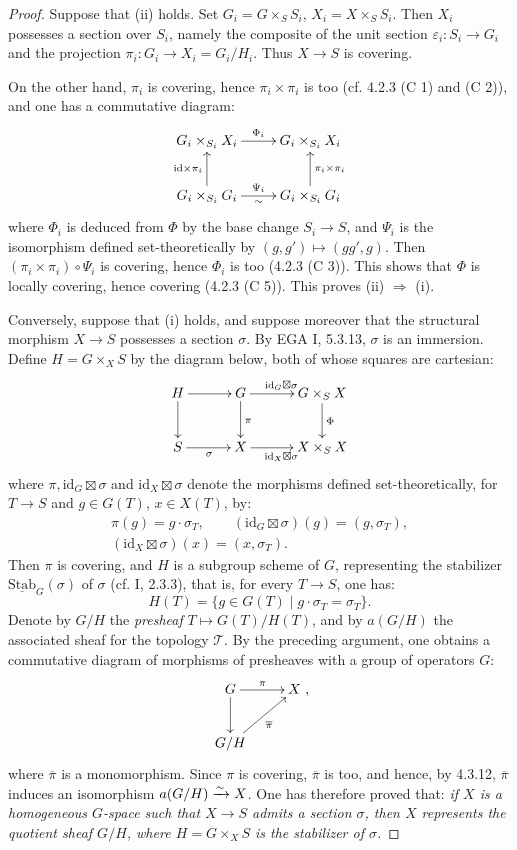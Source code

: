 \begin{proof}
Suppose that (ii) holds.
Set \(G_i=G\times_S S_i\),
\(X_i=X\times_S S_i\).
Then \(X_i\) possesses a section
over \(S_i\), namely the
composite of the unit section
\(\varepsilon_i:S_i\to G_i\)
and the projection
\(\pi_i:G_i\to X_i=G_i/H_i\).
Thus \(X\to S\) is covering.

On the other hand, \(\pi_i\)
is covering, hence \(\pi_i\times\pi_i\)
is too (cf. 4.2.3 (C 1)
and (C 2)), and one has
a commutative diagram:
\[
\xymatrix{
G_i\times_{S_i}X_i\ar[r]^{\Phi_i}
 & G_i\times_{S_i}X_i\\
G_i\times_{S_i}G_i
\ar[u]^{\mathrm{id}\times\pi_i}
\ar[r]_{\sim}^{\Psi_i}
 & G_i\times_{S_i}G_i
\ar[u]_{\pi_i\times\pi_i} }
\]
where \(\Phi_i\) is deduced
from \(\Phi\) by the base
change \(S_i\to S\), and
\(\Psi_i\) is the isomorphism
defined set-theoretically by
\((g,g')\mapsto(gg',g)\).
Then \((\pi_i\times\pi_i)\circ\Psi_i\)
is covering, hence \(\Phi_i\)
is too (4.2.3 (C 3)).
This shows that \(\Phi\) is
\og locally covering\fg, hence
covering (4.2.3 (C 5)).
This proves (ii) \(\Rightarrow\) (i).

Conversely, suppose that (i)
holds, and suppose moreover
that the structural morphism
\(X\to S\) possesses a section
\(\sigma\). By EGA I, 5.3.13,
\(\sigma\) is an immersion.
Define \(H=G\times_X S\)
by the diagram below, both
of whose squares are cartesian:
\[
\xymatrix@C=3em{
H\ar[r]\ar[d] & G\ar[r]^{\mathrm{id}_G\boxtimes\sigma}\ar[d]^\pi
 & G\times_S X\ar[d]^\Phi\\
S\ar[r]_\sigma & X\ar[r]_{\mathrm{id}_X\boxtimes\sigma}
 & X\times_S X }
\]
where \(\pi,\mathrm{id}_G\boxtimes\sigma\)
and \(\mathrm{id}_X\boxtimes\sigma\)
denote the morphisms defined
set-theoretically, for \(T\to S\)
and \(g\in G(T)\), \(x\in X(T)\), by:
\[
\begin{gathered}
\pi(g)=g\cdot\sigma_T,\qquad
(\mathrm{id}_G\boxtimes\sigma)(g)=(g,\sigma_T),\\
(\mathrm{id}_X\boxtimes\sigma)(x)=(x,\sigma_T).
\end{gathered}
\]
Then \(\pi\) is covering,
and \(H\) is a subgroup
scheme of \(G\), representing
the stabilizer
\(\underline{\mathrm{Stab}}_G(\sigma)\)
of \(\sigma\) (cf. I, 2.3.3),
that is, for every \(T\to S\), one has:
\[
H(T)=\{g\in G(T)\mid g\cdot\sigma_T=\sigma_T\}.
\]
Denote by \(G/H\) the
\emph{presheaf} \(T\mapsto G(T)/H(T)\),
and by \(a(G/H)\) the associated
sheaf for the topology \(\mathcal T\).
By the preceding argument,
one obtains a commutative
diagram of morphisms of
presheaves with a group of operators \(G\):
\[
\xymatrix{
G\ar[r]^\pi\ar[d] & X\\
G/H\ar[ur]_{\overline\pi} & },
\]
where \(\overline\pi\) is a
monomorphism. Since \(\pi\)
is covering, \(\overline\pi\)
is too, and hence, by 4.3.12,
\(\overline\pi\) induces an
isomorphism \(a(G/H)\xrightarrow{\sim} X\).
One has therefore proved that:
\emph{if \(X\) is a homogeneous
\(G\)-space such that \(X\to S\)
admits a section \(\sigma\),
then \(X\) represents the
quotient sheaf \(G/H\),
where \(H=G\times_X S\)
is the stabilizer of \(\sigma\).}


\end{proof}
